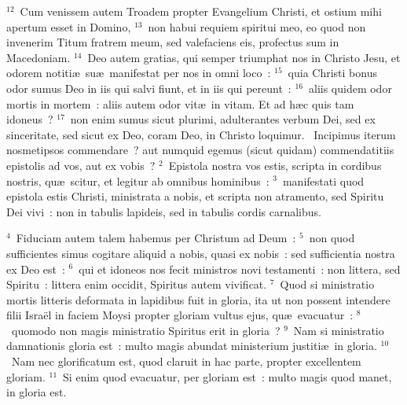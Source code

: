 ${}^{12}$~Cum venissem autem Troadem propter Evangelium Christi, et ostium mihi apertum esset in Domino,
${}^{13}$~non habui requiem spiritui meo, eo quod non invenerim Titum fratrem meum, sed valefaciens eis, profectus sum in Macedoniam.
${}^{14}$~Deo autem gratias, qui semper triumphat nos in Christo Jesu, et odorem notiti\ae\ su\ae\ manifestat per nos in omni loco~:
${}^{15}$~quia Christi bonus odor sumus Deo in iis qui salvi fiunt, et in iis qui pereunt~:
${}^{16}$~aliis quidem odor mortis in mortem~: aliis autem odor vit\ae\ in vitam. Et ad h\ae c quis tam idoneus~?
${}^{17}$~non enim sumus sicut plurimi, adulterantes verbum Dei, sed ex sinceritate, sed sicut ex Deo, coram Deo, in Christo loquimur.
~Incipimus iterum nosmetipsos commendare~? aut numquid egemus (sicut quidam) commendatitiis epistolis ad vos, aut ex vobis~?
${}^{2}$~Epistola nostra vos estis, scripta in cordibus nostris, qu\ae\ scitur, et legitur ab omnibus hominibus~:
${}^{3}$~manifestati quod epistola estis Christi, ministrata a nobis, et scripta non atramento, sed Spiritu Dei vivi~: non in tabulis lapideis, sed in tabulis cordis carnalibus.


${}^{4}$~Fiduciam autem talem habemus per Christum ad Deum~:
${}^{5}$~non quod sufficientes simus cogitare aliquid a nobis, quasi ex nobis~: sed sufficientia nostra ex Deo est~:
${}^{6}$~qui et idoneos nos fecit ministros novi testamenti~: non littera, sed Spiritu~: littera enim occidit, Spiritus autem vivificat.
${}^{7}$~Quod si ministratio mortis litteris deformata in lapidibus fuit in gloria, ita ut non possent intendere filii Isra\"el in faciem Moysi propter gloriam vultus ejus, qu\ae\ evacuatur~:
${}^{8}$~quomodo non magis ministratio Spiritus erit in gloria~?
${}^{9}$~Nam si ministratio damnationis gloria est~: multo magis abundat ministerium justiti\ae\ in gloria.
${}^{10}$~Nam nec glorificatum est, quod claruit in hac parte, propter excellentem gloriam.
${}^{11}$~Si enim quod evacuatur, per gloriam est~: multo magis quod manet, in gloria est.


